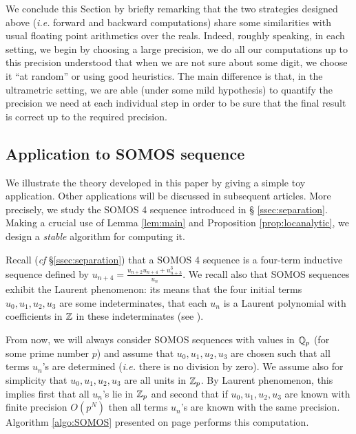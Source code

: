 \documentclass{lms}
\begin{document}
\medskip

We conclude this Section by briefly remarking that the two strategies designed 
above (\emph{i.e.} forward and backward computations) share some 
similarities with usual floating point arithmetics over the reals. 
Indeed, roughly speaking, in each setting, we begin by choosing a large 
precision, we do all our computations up to this precision understood 
that when we are not sure about some digit, we choose it ``at random'' 
or using good heuristics. The main difference is that, in the 
ultrametric setting, we are able (under some mild hypothesis) to 
quantify the precision we need at each individual step in order to be 
sure that the final result is correct up to the required precision.

\subsection{Application to SOMOS sequence}
\label{ssec:SOMOS-solution}

We illustrate the theory developed in this paper by giving a simple 
toy application. Other applications will be discussed in subsequent 
articles. More precisely, we study the SOMOS 4 sequence introduced in \S 
\ref{ssec:separation}. Making a crucial use of Lemma \ref{lem:main} and 
Proposition \ref{prop:locanalytic}, we design a \emph{stable} algorithm 
for computing it.

Recall (\emph{cf} \S \ref{ssec:separation}) that a SOMOS 4 sequence is a 
four-term inductive sequence defined by $u_{n+4} = \frac{u_{n+2} u_{n+4} 
+ u_{n+3}^3}{u_n}$. We recall also that SOMOS sequences exhibit the 
Laurent phenomenon: its means that the four initial terms $u_0, u_1, 
u_2, u_3$ are some indeterminates, that each $u_n$ is a Laurent 
polynomial with coefficients in $\mathbb Z$ in these indeterminates
(see \cite{fomin-zelevinsky:02a}).

From now, we will always consider SOMOS sequences with values in $\mathbb Q_p$ 
(for some prime number $p$) and assume that $u_0, u_1, u_2, u_3$ are 
chosen such that all terms $u_n$'s are determined (\emph{i.e.} there is 
no division by zero). We assume also for simplicity that $u_0, u_1, u_2, 
u_3$ are all units in $\mathbb Z_p$. By Laurent phenomenon, this implies first 
that all $u_n$'s lie in $\mathbb Z_p$ and second that if $u_0, u_1, u_2, u_3$ 
are known with finite precision $O(p^N)$ then all terms $u_n$'s are 
known with the same precision. Algorithm \ref{algo:SOMOS} presented on 
page \pageref{algo:SOMOS} performs this computation.
\end{document}
